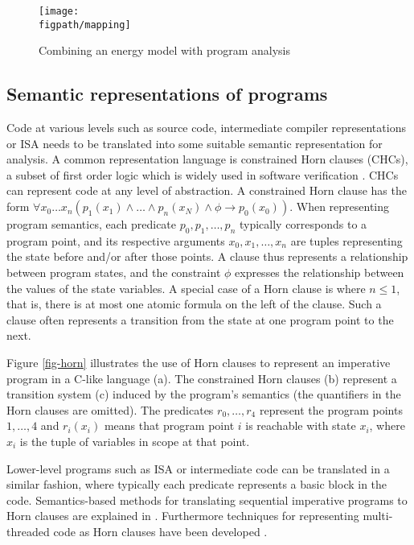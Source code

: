 \begin{figure}
\texttt{[image: \\figpath/mapping]}   
 \caption{Combining an energy model with program analysis}
 \label{fig-model-mapping}
 \end{figure}

\subsection{Semantic representations of programs}
Code at various levels such as source code, intermediate compiler
representations or ISA needs to be translated into some suitable semantic
representation for analysis.   A common representation language is
constrained Horn clauses (CHCs), a subset of first order logic which is
widely used in software verification
\cite{DBLP:conf/birthday/BjornerGMR15}. CHCs can represent code at any
level of abstraction. A constrained Horn clause has the form $\forall x_0 \ldots x_n 
(p_1(x_1) \wedge \ldots \wedge p_n(x_N) \wedge \phi \rightarrow
p_0(x_0))$. When representing program semantics, each predicate
$p_0,p_1,\ldots,p_n$ typically corresponds to a program point, and its
respective arguments $x_0,x_1,\ldots,x_n$ are tuples representing the
state before and/or after those points.  A clause thus represents a
relationship between program states, and the constraint $\phi$ expresses
the relationship between the values of the state variables. A special case
of a Horn clause is where $n \le 1$, that is, there is at most one atomic
formula on the left of the clause.  Such a clause often represents a transition 
from the state at one program point to the next.

Figure \ref{fig-horn} illustrates the use of Horn clauses to 
represent an imperative program in a C-like language (a).
The constrained Horn clauses (b) represent a transition
system (c) induced by the program's semantics (the quantifiers in
the Horn clauses are
omitted).  The predicates
$r_0, \ldots, r_4$ represent the program points $1,\ldots,4$ and
$r_i(x_i)$ means that program point $i$  is reachable with state
$x_i$, where $x_i$ is the tuple of variables in scope at that point.

Lower-level programs such as ISA or intermediate code can be translated
in a similar fashion, where typically each predicate represents a basic block 
in the code. Semantics-based methods for translating sequential
imperative programs to
Horn clauses are explained in \cite{DBLP:conf/ppdp/AngelisFPP15}.
Furthermore techniques for representing multi-threaded
code as Horn clauses have been developed \cite{ GrebenshchikovLPR12}.

